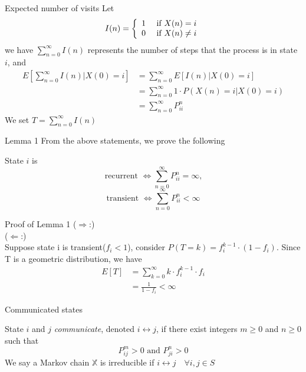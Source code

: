 \documentclass[mathserif]{beamer}
\begin{document}
\begin{frame}{Expected number of visits}
	Let 
	\[
	I(n) = \left\{
	\begin{array}{l l}
		1 & ~\text{if $X(n) = i$}\\
		0 & ~\text{if $X(n) \neq i$} \\
	\end{array} \right.
	\]
	we have $\sum_{n=0}^\infty I(n)$ represents the number of steps that the process is in state $i$, and
	\begin{align*}
	E\left[ \sum_{n=0}^\infty I(n)|X(0) = i \right] & = \sum_{n=0}^\infty E[I(n)|X(0)=i] \\
	& = \sum_{n=0}^\infty 1 \cdot P(X(n)=i|X(0)=i) \\
	& = \sum_{n=0}^\infty P^n_{ii}
	\end{align*}
	We set $T = \sum_{n=0}^\infty I(n)$
\end{frame}

\begin{frame}{Lemma 1}
	From the above statements, we prove the following
	\begin{lemma}
	State $i$ is 
	\[
	\text{recurrent } \iff \sum_{n=0}^\infty P^n_{ii} = \infty \text{,}
	\]
	\[
	\text{transient } \iff \sum_{n=0}^\infty P^n_{ii} < \infty
	\]
	\end{lemma}
\end{frame}

\begin{frame}{Proof of Lemma 1}
	($\Rightarrow$:)\\
	($\Leftarrow$:)\\
	Suppose state i is transient($f_i < 1$), consider $P(T=k) = f_i^{k-1} \cdot (1-f_i)$. Since T is a geometric distribution, we have
	\begin{align*}
		E[T] 	&= \sum_{k = 0}^\infty k \cdot f_i^{k-1} \cdot f_i \\
			&=\frac{1}{1-f_i} < \infty
	\end{align*}
\end{frame}

\begin{frame}{Communicated states}
	\begin{definition}
	State $i$ and $j$ \textit{communicate}, denoted $i \leftrightarrow j$,
	if there exist integers $m \geq 0$ and $n \geq 0$ such that
	\[
	P^m_{ij} > 0 \text{ and } P^n_{ji} > 0
	\]
	We say a Markov chain $\mathbb{X}$ is irreducible if $i \leftrightarrow j \quad \forall i, j \in S$
	\end{definition}
\end{frame}
\end{document}
